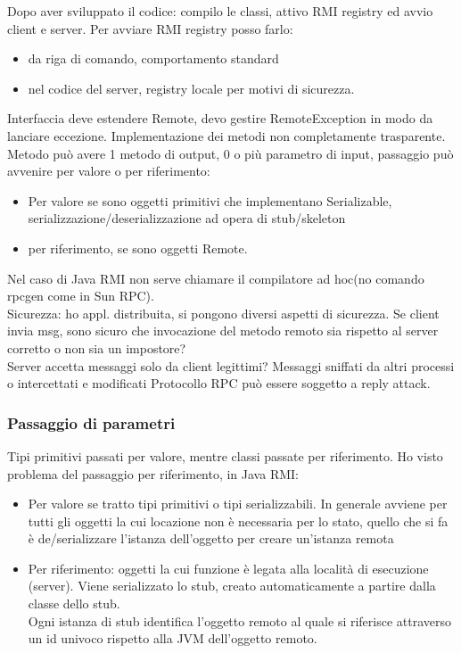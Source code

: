 \documentclass{article}
\begin{document}
Dopo aver sviluppato il codice: compilo le classi, attivo RMI registry ed avvio client e server. Per avviare RMI registry posso farlo:
\begin{itemize}
\item da riga di comando, comportamento standard
\item nel codice del server, registry locale per motivi di sicurezza.
\end{itemize}
Interfaccia deve estendere Remote, devo gestire RemoteException in modo da lanciare eccezione. Implementazione dei metodi non completamente trasparente. Metodo può avere 1 metodo di output, 0 o più parametro di input, passaggio può avvenire per valore o per riferimento:
\begin{itemize}
\item Per valore se sono oggetti primitivi che implementano Serializable, serializzazione/deserializzazione ad opera di stub/skeleton
\item per riferimento, se sono oggetti Remote.
\end{itemize}
Nel caso di Java RMI non serve chiamare il compilatore ad hoc(no comando rpcgen come in Sun RPC).\\ Sicurezza: ho appl. distribuita, si pongono diversi aspetti di sicurezza. Se client invia msg, sono sicuro che invocazione del metodo remoto sia rispetto al server corretto o non sia un impostore?\\ Server accetta messaggi solo da client legittimi? Messaggi sniffati da altri processi o intercettati e modificati Protocollo RPC può essere soggetto a reply attack.
\subsubsection{Passaggio di parametri}
Tipi primitivi passati per valore, mentre classi passate per riferimento. Ho visto problema del passaggio per riferimento, in Java RMI:
\begin{itemize}
\item Per valore se tratto tipi primitivi o tipi serializzabili. In generale avviene per tutti gli oggetti la cui locazione non è necessaria per lo stato, quello che si fa è de/serializzare l'istanza dell'oggetto per creare un'istanza remota
\item Per riferimento: oggetti la cui funzione è legata alla località di esecuzione (server). Viene serializzato lo stub, creato automaticamente a partire dalla classe dello stub.\\ Ogni istanza di stub identifica l'oggetto remoto al quale si riferisce attraverso un id univoco rispetto alla JVM dell'oggetto remoto. 
\end{itemize}
\end{document}
